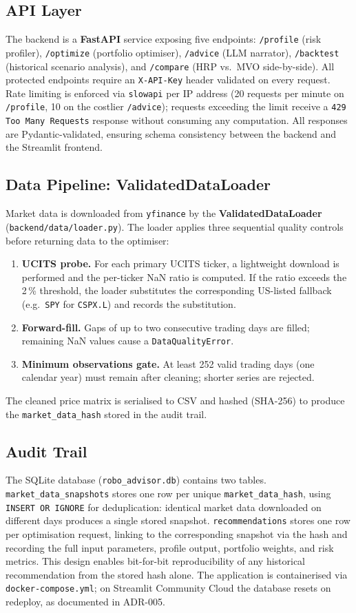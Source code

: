 \documentclass[11pt, a4paper]{article}
\begin{document}
\subsection{API Layer}
The backend is a \textbf{FastAPI} service exposing five endpoints: \texttt{/profile} (risk profiler), \texttt{/optimize} (portfolio optimiser), \texttt{/advice} (LLM narrator), \texttt{/backtest} (historical scenario analysis), and \texttt{/compare} (HRP vs.\ MVO side-by-side). All protected endpoints require an \texttt{X-API-Key} header validated on every request. Rate limiting is enforced via \texttt{slowapi} per IP address (20 requests per minute on \texttt{/profile}, 10 on the costlier \texttt{/advice}); requests exceeding the limit receive a \texttt{429 Too Many Requests} response without consuming any computation. All responses are Pydantic-validated, ensuring schema consistency between the backend and the Streamlit frontend.

\subsection{Data Pipeline: ValidatedDataLoader}
Market data is downloaded from \texttt{yfinance} by the \textbf{ValidatedDataLoader} (\texttt{backend/data/loader.py}). The loader applies three sequential quality controls before returning data to the optimiser:
\begin{enumerate}
  \item \textbf{UCITS probe.} For each primary UCITS ticker, a lightweight download is performed and the per-ticker NaN ratio is computed. If the ratio exceeds the 2\,\% threshold, the loader substitutes the corresponding US-listed fallback (e.g.\ \texttt{SPY} for \texttt{CSPX.L}) and records the substitution.
  \item \textbf{Forward-fill.} Gaps of up to two consecutive trading days are filled; remaining NaN values cause a \texttt{DataQualityError}.
  \item \textbf{Minimum observations gate.} At least 252 valid trading days (one calendar year) must remain after cleaning; shorter series are rejected.
\end{enumerate}
The cleaned price matrix is serialised to CSV and hashed (SHA-256) to produce the \texttt{market\_data\_hash} stored in the audit trail.

\subsection{Audit Trail}
The SQLite database (\texttt{robo\_advisor.db}) contains two tables. \texttt{market\_data\_snapshots} stores one row per unique \texttt{market\_data\_hash}, using \texttt{INSERT OR IGNORE} for deduplication: identical market data downloaded on different days produces a single stored snapshot. \texttt{recommendations} stores one row per optimisation request, linking to the corresponding snapshot via the hash and recording the full input parameters, profile output, portfolio weights, and risk metrics. This design enables bit-for-bit reproducibility of any historical recommendation from the stored hash alone. The application is containerised via \texttt{docker-compose.yml}; on Streamlit Community Cloud the database resets on redeploy, as documented in ADR-005.
\end{document}
